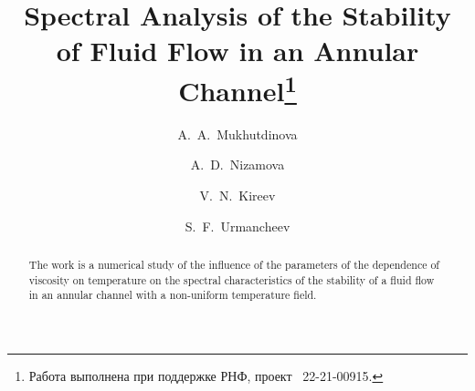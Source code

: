 \begin{englishtitle} %
\title{Spectral Analysis of the Stability of Fluid Flow in an Annular Channel\thanks{Работа выполнена при поддержке РНФ, проект \textnumero~22-21-00915.}}
\author{A.~A.~Mukhutdinova
  \and
  A.~D.~Nizamova
	\and
  V.~N.~Kireev
	\and
  S.~F.~Urmancheev
 }

\maketitle

\begin{abstract}
The work is a numerical study of the influence of the parameters of the dependence of viscosity on temperature on the spectral characteristics of the stability of a fluid flow in an annular channel with a non-uniform temperature field.

\end{abstract}
\end{englishtitle}

\iffalse

%
%

